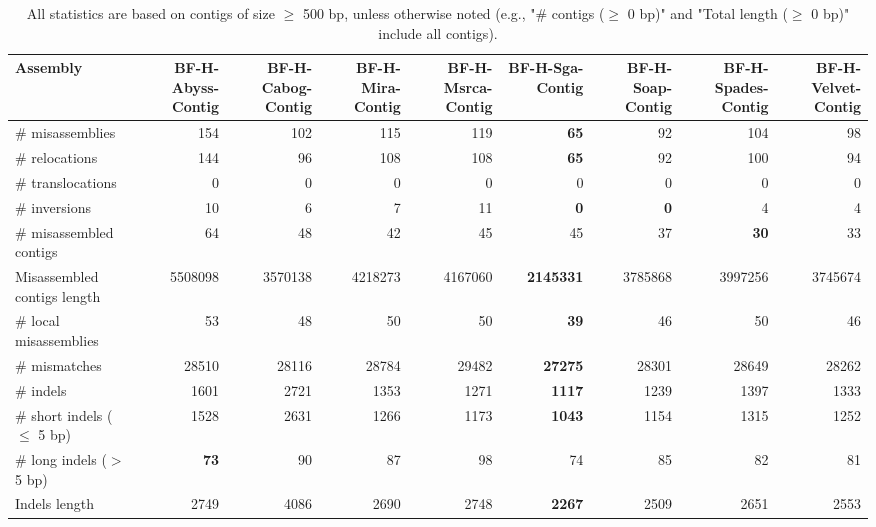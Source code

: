 \documentclass[12pt,a4paper]{article}
\begin{document}
\begin{table}[ht]
\begin{center}
\caption{All statistics are based on contigs of size $\geq$ 500 bp, unless otherwise noted (e.g., "\# contigs ($\geq$ 0 bp)" and "Total length ($\geq$ 0 bp)" include all contigs).}
\begin{tabular}{|l*{8}{|r}|}
\hline
Assembly & BF-H-Abyss-Contig & BF-H-Cabog-Contig & BF-H-Mira-Contig & BF-H-Msrca-Contig & BF-H-Sga-Contig & BF-H-Soap-Contig & BF-H-Spades-Contig & BF-H-Velvet-Contig \\ \hline
\# misassemblies & 154 & 102 & 115 & 119 & {\bf 65} & 92 & 104 & 98 \\ \hline
\hspace{5mm}\# relocations & 144 & 96 & 108 & 108 & {\bf 65} & 92 & 100 & 94 \\ \hline
\hspace{5mm}\# translocations & 0 & 0 & 0 & 0 & 0 & 0 & 0 & 0 \\ \hline
\hspace{5mm}\# inversions & 10 & 6 & 7 & 11 & {\bf 0} & {\bf 0} & 4 & 4 \\ \hline
\# misassembled contigs & 64 & 48 & 42 & 45 & 45 & 37 & {\bf 30} & 33 \\ \hline
Misassembled contigs length & 5508098 & 3570138 & 4218273 & 4167060 & {\bf 2145331} & 3785868 & 3997256 & 3745674 \\ \hline
\# local misassemblies & 53 & 48 & 50 & 50 & {\bf 39} & 46 & 50 & 46 \\ \hline
\# mismatches & 28510 & 28116 & 28784 & 29482 & {\bf 27275} & 28301 & 28649 & 28262 \\ \hline
\# indels & 1601 & 2721 & 1353 & 1271 & {\bf 1117} & 1239 & 1397 & 1333 \\ \hline
\hspace{5mm}\# short indels ($\leq$ 5 bp) & 1528 & 2631 & 1266 & 1173 & {\bf 1043} & 1154 & 1315 & 1252 \\ \hline
\hspace{5mm}\# long indels ($>$ 5 bp) & {\bf 73} & 90 & 87 & 98 & 74 & 85 & 82 & 81 \\ \hline
Indels length & 2749 & 4086 & 2690 & 2748 & {\bf 2267} & 2509 & 2651 & 2553 \\ \hline
\end{tabular}
\end{center}
\end{table}
\end{document}
